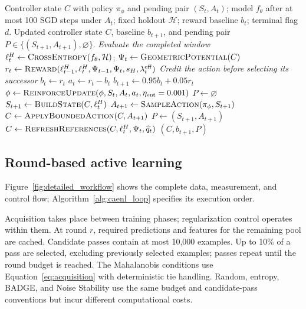 \documentclass[a4paper,fleqn]{cas-dc}
\let\CAENLcaption\caption
\let\CAENLalgorithmcaption\caption
\let\caption\CAENLcaption
\begin{document}
\begin{algorithm*}[p]
\small
\let\caption\CAENLalgorithmcaption
\caption{\textbf{Full-MACC update at the end of a control window}}
\label{alg:macc_policy}
\begin{algorithmic}[1]
\Require Controller state $C$ with policy $\pi_\phi$ and pending pair $(S_t,A_t)$;
model $f_\theta$ after at most 100 SGD steps under $A_t$;
fixed holdout $\mathcal H$; reward baseline $b_t$; terminal flag $d$.
\Ensure Updated controller state $C$, baseline $b_{t+1}$, and pending pair
$P\in\{(S_{t+1},A_{t+1}),\varnothing\}$.
\Statex \textit{Evaluate the completed window}
\State $\ell_t^H\gets\Call{CrossEntropy}{f_\theta,\mathcal H}$;
       $\Psi_t\gets\Call{GeometricPotential}{C}$
\State $r_t\gets\Call{Reward}{\ell_{t-1}^H,\ell_t^H,\Psi_{t-1},\Psi_t,s_H,
       \lambda_t^{\mathrm{eff}}}$ 
\Statex \textit{Credit the action before selecting its successor}
    \State $b_t\gets r_t$ 
\EndIf
\State $a_t\gets r_t-b_t$
\State $b_{t+1}\gets0.95b_t+0.05r_t$
    \State $\phi\gets\Call{ReinforceUpdate}{\phi,S_t,A_t,a_t,\eta_{\mathrm{ent}}=0.001}$
\EndIf
\State $P\gets\varnothing$ 
    \State $S_{t+1}\gets\Call{BuildState}{C,\ell_t^H}$
    \State $A_{t+1}\gets\Call{SampleAction}{\pi_\phi,S_{t+1}}$
    \State $C\gets\Call{ApplyBoundedAction}{C,A_{t+1}}$
    \State $P\gets(S_{t+1},A_{t+1})$
\EndIf
\State $C\gets\Call{RefreshReferences}{C,\ell_t^H,\Psi_t,\widehat q_t}$
\State \Return $(C,b_{t+1},P)$ 
\end{algorithmic}
\end{algorithm*}

\subsection{Round-based active learning}
\label{sec:workflow}
Figure~\ref{fig:detailed_workflow} shows the complete data, measurement,
and control flow; Algorithm~\ref{alg:caenl_loop} specifies its execution order.

Acquisition takes place between training phases; regularization
control operates within them. At round $r$, required predictions
and features for the remaining pool are cached. Candidate passes
contain at most 10,000 examples. Up to 10\% of a pass are selected,
excluding previously selected examples; passes repeat until the
round budget is reached. The Mahalanobis conditions use
Equation~\eqref{eq:acquisition} with deterministic tie handling.
Random, entropy, BADGE, and Noise Stability use the same budget
and candidate-pass conventions but incur different computational
costs.
\end{document}
